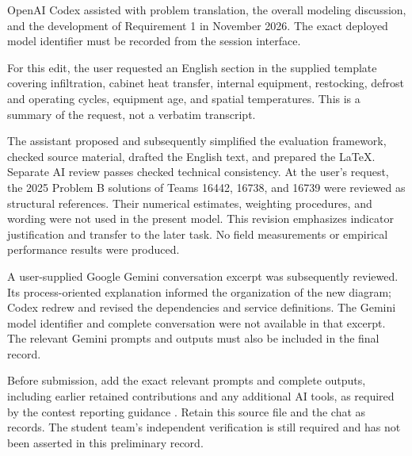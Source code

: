 \documentclass[12pt]{article}
\begin{document}
OpenAI Codex assisted with problem translation, the overall modeling discussion,
and the development of Requirement 1 in November 2026. The exact deployed model
identifier must be recorded from the session interface.

For this edit, the user requested an English section in the supplied template
covering infiltration, cabinet heat transfer, internal equipment, restocking,
defrost and operating cycles, equipment age, and spatial temperatures. This is
a summary of the request, not a verbatim transcript.

The assistant proposed and subsequently simplified the evaluation framework,
checked source material, drafted the English text, and prepared the LaTeX.
Separate AI review passes checked technical consistency. At the user's request,
the 2025 Problem B solutions of Teams 16442, 16738, and 16739 were reviewed as
structural references. Their numerical estimates, weighting procedures, and
wording were not used in the present model. This revision emphasizes indicator
justification and transfer to the later task. No field measurements or empirical
performance results were produced.

A user-supplied Google Gemini conversation excerpt was subsequently reviewed.
Its process-oriented explanation informed the organization of the new diagram;
Codex redrew and revised the dependencies and service definitions. The Gemini
model identifier and complete conversation were not available in that excerpt.
The relevant Gemini prompts and outputs must also be included in the final record.

Before submission, add the exact relevant prompts and complete outputs,
including earlier retained contributions and any additional AI tools, as
required by the contest reporting guidance \cite{aipolicy}. Retain this source
file and the chat as records. The student team's independent verification is
still required and has not been asserted in this preliminary record.
\end{document}
